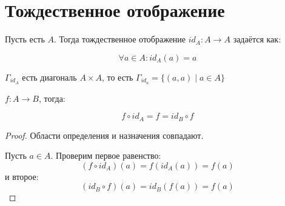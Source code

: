 ﻿\section{Тождественное отображение}

\begin{Def} Пусть есть $A$. Тогда тождественное отображение $id_{A}: A \to A$ задаётся как:

\[\forall a \in A\colon id_A(a) = a\]

$\Gamma_{id_A}$ есть диагональ $A \times A$, то есть $\Gamma_{id_a} = \{(a, a) \mid a \in A\}$
\end{Def}

\begin{theorem}{}
$f: A \to B$, тогда:

\[f \circ id_A = f =  id_B \circ f\]
\end{theorem}

\begin{proof}

Области определения и назначения совпадают.

Пусть $a \in A$. Проверим первое равенство:
\[(f \circ id_A)(a) = f(id_A(a)) = f(a)\]
и второе:
\[(id_B \circ f)(a) = id_B(f(a)) = f(a)\]

\end{proof}